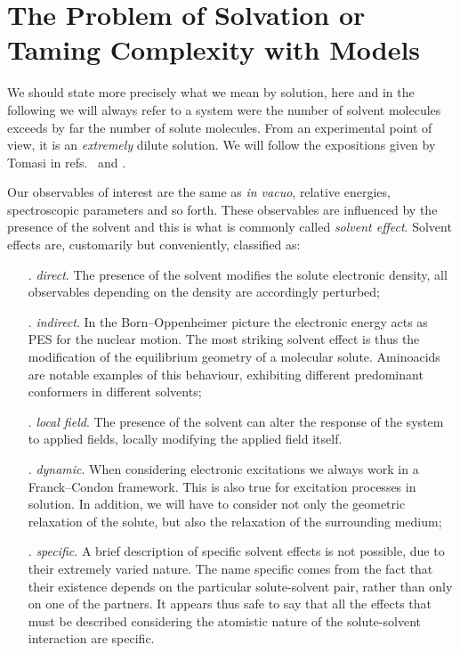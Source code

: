 \section*{The Problem of Solvation or Taming Complexity with Models}


We should state more precisely what we mean by solution, here and in the
following we will always refer to a system were the number of solvent
molecules exceeds by far the number of solute molecules. From an
experimental point of view, it is an \emph{extremely} dilute solution.
We will follow the expositions given by Tomasi in refs.~
 and .

Our observables of interest are the same as \emph{in vacuo}, \ie
relative energies, spectroscopic parameters and so forth. These
observables are influenced by the presence of the solvent and this is
what is commonly called \emph{solvent effect}.
Solvent effects are, customarily but conveniently, classified as:
\begin{itemize}
\item[.] \emph{direct}. The presence of the solvent modifies the solute
  electronic density, all observables depending on the density are
  accordingly perturbed;
\item[.] \emph{indirect}. In the Born--Oppenheimer picture the
  electronic energy acts as \ac{PES} for the
  nuclear motion. The most striking solvent effect is thus the
  modification of the equilibrium geometry of a molecular solute.
  Aminoacids are notable examples of this behaviour, exhibiting
  different predominant conformers in different solvents;
\item[.] \emph{local field}. The presence of the solvent can alter the
  response of the system to applied fields, locally modifying the
  applied field itself.~\autocite{Cammi1998-jp, Pipolo2014-sd}
\item[.] \emph{dynamic}. When considering electronic excitations we
  always work in a Franck--Condon framework. This is also true for
  excitation processes in solution. In addition, we will have to
  consider not only the geometric relaxation of the solute, but also the
  relaxation of the surrounding medium;
\item[.] \emph{specific}. A brief description of specific solvent
  effects is not possible, due to their extremely varied nature. The
  name specific comes from the fact that their existence depends on the
  particular solute-solvent pair, rather than only on one of the
  partners. It appears thus safe to say that all the effects that must
  be described considering the atomistic nature of the solute-solvent
  interaction are specific.
\end{itemize}

